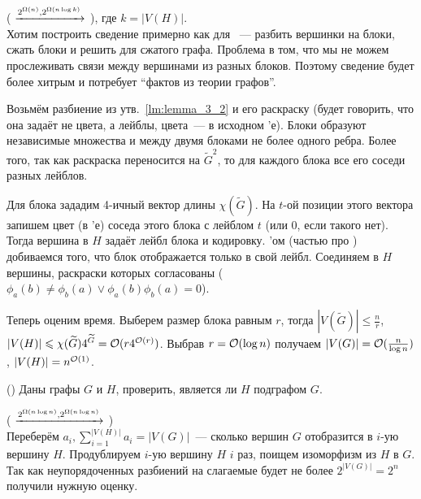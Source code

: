 \begin{reduction}( $\xrightarrow{2^{\Omega(n)}, 2^{\Omega(n \log k)}}$ ), где $k = |V(H)|$.\\

Хотим построить сведение примерно как для ~--- разбить вершинки на блоки, сжать блоки и решить  для сжатого графа. Проблема в том, что мы не можем прослеживать связи между вершинами из разных блоков. Поэтому сведение будет более хитрым и потребует ``фактов из теории графов''.

Возьмём разбиение из утв.~\ref{lm:lemma_3_2} и его раскраску (будет говорить, что она задаёт не цвета, а лейблы, цвета~--- в исходном 'е). Блоки образуют независимые множества и между двумя блоками не более одного ребра. Более того, так как раскраска переносится на $\widetilde{G}^2$, то для каждого блока все его соседи разных лейблов.

Для блока зададим 4-ичный вектор длины $\chi(\widetilde{G})$. На $t$-ой позиции этого вектора запишем цвет (в 'е) соседа этого блока с лейблом $t$ (или 0, если такого нет). Тогда вершина в $H$ задаёт лейбл блока и кодировку. 'ом (частью про ) добиваемся того, что блок отображается только в свой лейбл. Соединяем в $H$ вершины, раскраски которых согласованы ($\phi_a (b) \neq \phi_b (a) \vee \phi_a (b) \phi_b (a) = 0$).

Теперь оценим время. Выберем размер блока равным $r$, тогда $|V(\widetilde{G})| \le \frac{n}{r}$, $|V(H)| \leqslant \chi(\widetilde{G}) 4^{\widetilde{G}} = \mathcal{O}(r 4^{\mathcal{O}(r)})$. Выбрав $r = \mathcal{O}(\log n)$ получаем $|V(G)| = \mathcal{O}(\frac{n}{\log n})$, $|V(H)| = n^{\mathcal{O}(1)}$.

\end{reduction}

\begin{problem}()
Даны графы $G$ и $H$, проверить, является ли $H$ подграфом $G$.
\end{problem}

\begin{reduction}( $\xrightarrow{2^{\Omega(n \log n)}, 2^{\Omega(n \log n)}}$ )\\
Переберём $a_i, \sum\limits_{i=1}^{|V(H)|} a_i = |V(G)|$~--- сколько вершин $G$ отобразится в $i$-ую вершину $H$. Продублируем $i$-ую вершину $H$ $i$ раз, поищем изоморфизм из $H$ в $G$. Так как неупорядоченных разбиений на слагаемые будет не более $2^{|V(G)|} = 2^{n}$ получили нужную оценку.

\end{reduction}

